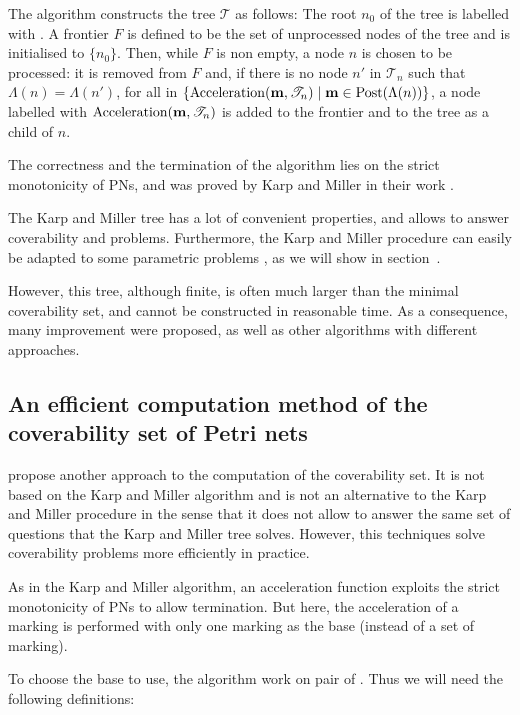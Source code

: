 The algorithm constructs the tree $\mathcal{T}$ as follows:
The root $n_0$ of the tree is labelled with \marqi.
A frontier $F$ is defined to be the set of unprocessed nodes of the tree and is initialised to $\{n_0\}$.
Then, while $F$ is non empty, a node $n$ is chosen to be processed:
it is removed from $F$ and, if there is no node $n'$ in $\mathscr{T}_n$ such that $\Lambda(n) = \Lambda(n')$, for all \omark in $\{\operatorname{Acceleration}(\mathbf{m}, \mathscr{T}_n) \mid \mathbf{m} \in \operatorname{Post}(\Lambda(n))\}$, a node labelled with $\operatorname{Acceleration}(\mathbf{m}, \mathscr{T}_n)$ is added to the frontier and to the tree as a child of $n$.

The correctness and the termination of the algorithm lies on the strict monotonicity of \acp{PN}, and was proved by Karp and Miller in their work \cite{Karp69}.

The Karp and Miller tree has a lot of convenient properties, and allows to answer coverability and \todo{} problems.
Furthermore, the Karp and Miller procedure can easily be adapted to some parametric problems \cite{David17}, as we will show in section~\todo{}.

However, this tree, although finite, is often much larger than the minimal coverability set, and cannot be constructed in reasonable time.
As a consequence, many improvement were proposed, as well as other algorithms with different approaches.

\subsection{An efficient computation method of the coverability set of Petri nets}
\label{sec:eff}

\citep{Geeraerts07thesis, Geeraerts07} propose another approach to the computation of the coverability set.
It is not based on the Karp and Miller algorithm and is not an alternative to the Karp and Miller procedure in the sense that it does not allow to answer the same set of questions that the Karp and Miller tree solves.
However, this techniques solve coverability problems more efficiently in practice.

As in the Karp and Miller algorithm, an acceleration function exploits the strict monotonicity of \acp{PN} to allow termination.
But here, the acceleration of a marking is performed with only one marking as the base (instead of a set of marking).

To choose the base to use, the algorithm work on pair of \omarks.
Thus we will need the following definitions:



